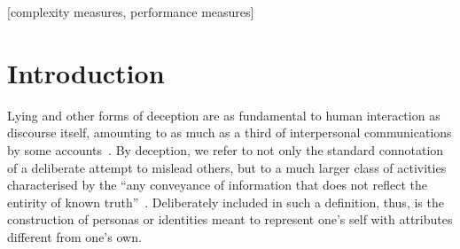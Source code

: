 \documentclass{sig-alternate}
\begin{document}
\maketitle

\begin{abstract}

\end{abstract}

[complexity measures, performance measures]



\section{Introduction}



Lying and other forms of deception are as fundamental to human interaction as discourse itself, amounting to as much as a third of interpersonal communications by some accounts~\cite{depaulo1996lying}.  By deception, we refer to not only the standard connotation of a deliberate attempt to mislead others, but to a much larger class of activities characterised by the ``any conveyance of information that does not reflect the entirity of known truth''~\cite{camden1984white}.  Deliberately included in such a definition, thus, is the construction of personas or identities meant to represent one's self with attributes different from one's own. 
\end{document}
